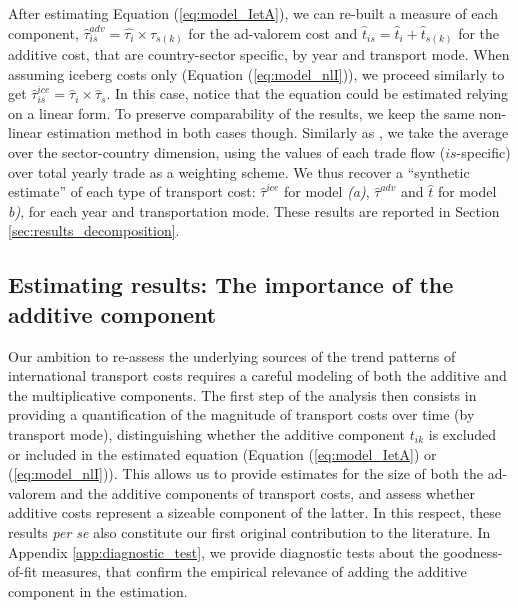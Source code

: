 \documentclass[a4paper,11pt]{article}
\begin{document}


After estimating Equation (\ref{eq:model_IetA}), we can re-built a measure of each component, $\widehat{\tau}^{adv}_{is} = \widehat{\tau_{i}} \times \widehat{\tau}_{s(k)}$ for the ad-valorem cost and $\widehat{t}_{is} = \widehat{t}_{i} + \widehat{t}_{s(k)}$ for the additive cost, that are country-sector specific, by year and transport mode. When assuming iceberg costs only (Equation (\ref{eq:model_nlI})), we proceed similarly to get $\widehat{\tau}^{ice}_{is} = \widehat{\tau}_{i} \times \widehat{\tau}_{s}$. In this case, notice that the equation could be estimated relying on a linear form. To preserve comparability of the results, we keep the same non-linear estimation method in both cases though. Similarly as \citet{Irrazabal_2015}, we take the average over the sector-country dimension, using the values of each trade flow ($is$-specific) over total yearly trade as a weighting scheme. We thus recover a ``synthetic estimate'' of each type of transport cost: $\widehat{\tau}^{ice}$ for model \emph{(a)}, $\widehat{\tau}^{adv}$ and $\widehat{t}$ for model \textit{b)}, for each year and transportation mode. These results are reported in Section \ref{sec:results_decomposition}.


\subsection{Estimating results: The importance of the additive component \label{sec:results_decomposition}}

Our ambition to re-assess the underlying sources of the trend patterns of international transport costs requires a careful modeling of both the additive and the multiplicative components. The first step of the analysis then consists in providing a quantification of the magnitude of transport costs over time (by transport mode), distinguishing whether the additive component $t_{ik}$ is excluded or included in the estimated equation (Equation (\ref{eq:model_IetA}) or (\ref{eq:model_nlI})). This allows us to provide estimates for the size of both the ad-valorem and the additive components of transport costs, and assess whether additive costs represent a sizeable component of the latter. In this respect, these results \textit{per se} also constitute our first original contribution to the literature. In Appendix \ref{app:diagnostic_test}, we provide diagnostic tests about the goodness-of-fit measures, that confirm the empirical relevance of adding the additive component in the estimation.\smallskip
\end{document}
